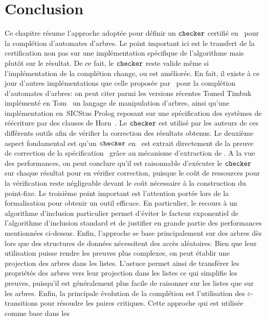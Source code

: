 \section{Conclusion}
\label{sec:conclusion}
Ce chapitre résume l'approche adoptée pour définir un $\mathtt{checker}$ certifié en \coq\ 
pour la complétion d'automates d'arbres. Le point important ici est le transfert
de la certification non pas sur une implémentation spécifique de l'algorithme
mais plutôt sur le résultat. De ce fait, le $\mathtt{checker}$ reste valide même si l'implémentation
de la complétion change, ou est améliorée. En fait, il existe à ce jour d'autres implémentations
que celle proposée par \timbuk\ pour la complétion d'automates d'arbres: on peut citer parmi les versions
récentes \textsf{Tomed Timbuk}~\cite{BallandBGM-AMAST08} implémenté en Tom~\cite{TOM} un langage de manipulation
d'arbres, ainsi qu'une implémentation en~\textsf{SICStus Prolog} reposant sur une spécification des systèmes
de réécriture par des clauses de Horn~\cite{GallagherR-LPAR08}. Le $\mathtt{checker}$ est utilisé par les auteurs
de ces différents outils afin de vérifier la correction des résultats obtenus. 
Le deuxième aspect fondamental est qu'un $\mathtt{checker}$ en \ocaml\ est extrait directement de la preuve
de correction de la spécification \coq\ grâce au mécanisme d'extraction de \coq.
A la vue des performances, on peut conclure qu'il est raisonnable d'exécuter le $\mathtt{checker}$ sur chaque résultat pour en vérifier
correction, puisque le coût de ressources pour la vérification reste négligeable devant le coût nécessaire
à la construction du point-fixe.
Le troisième point important est l'attention portée lors de la formalisation pour obtenir un
outil efficace. En particulier, le recours à un algorithme d'inclusion
particulier permet d'éviter le facteur exponentiel de l'algorithme d'inclusion standard et de justifier en 
grande partie des performances mentionnées ci-dessus. Enfin, l'approche se base principalement sur
des arbres dès lors que des structures de données nécessitent des accès aléatoires. Bien que leur utilisation puisse rendre les preuves plus complexes, on peut établir
une projection des arbres dans les listes. L'astuce permet ainsi de transférer les propriétés 
des arbres vers leur projection dans les listes ce qui simplifie les preuves, puisqu'il est généralement
plus facile de raisonner sur les listes que sur les arbres.
Enfin, la principale évolution de la complétion est l'utilisation des $\varepsilon$-transitions 
pour résoudre les paires critiques. Cette approche qui est utilisée comme base dans les

